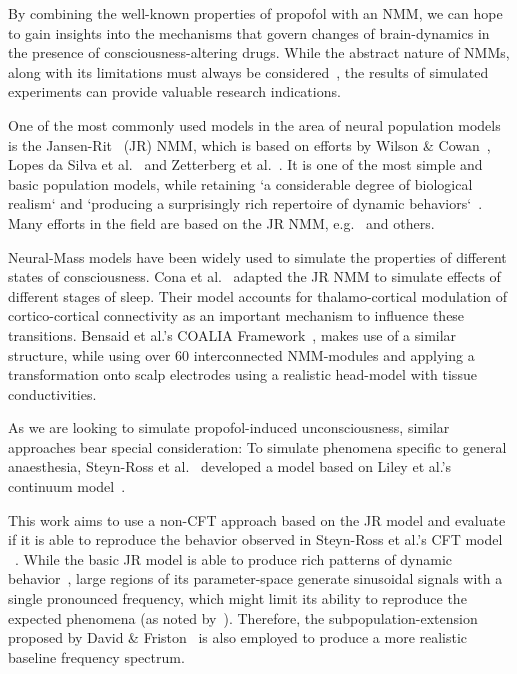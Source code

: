 
By combining the well-known properties of propofol with an NMM, we can hope to gain insights into the mechanisms that
govern changes of brain-dynamics in the presence of consciousness-altering drugs.
While the abstract nature of NMMs, along with its limitations must always be
considered~\cite{deschle_validity_2021},
the results of simulated experiments can provide valuable research indications.


One of the most commonly used models in the area of neural population models is the
Jansen-Rit~\cite{jansen_electroencephalogram_1995} (JR) NMM,
which is based on efforts by Wilson \& Cowan~\cite{wilson_excitatory_1972},
Lopes da Silva et al.~\cite{lopes_da_silva_model_1974, lopes_da_silva_models_1976} and
Zetterberg et al.~\cite{zetterberg_performance_1978}.
It is one of the most simple and basic population models,
while retaining `a considerable degree of biological realism` and
`producing a surprisingly rich repertoire of dynamic behaviors`~\cite{knösche_jansen-rit_2014}.
Many efforts in the field are based on the JR NMM, e.g.~\cite{wendling_relevance_2000, david_neural_2003,
    moran_dynamic_2009, spiegler_bifurcation_2010, cona_thalamo-cortical_2014, bensaid_coalia_2019} and others.



Neural-Mass models have been widely used to simulate the properties of different states of consciousness.
Cona et al.~\cite{cona_thalamo-cortical_2014} adapted the JR NMM to simulate effects
of different stages of sleep.
Their model accounts for thalamo-cortical modulation of cortico-cortical connectivity as an important mechanism to
influence these transitions.
Bensaid et al.'s COALIA Framework~\cite{bensaid_coalia_2019},
makes use of a similar structure, while using over 60 interconnected NMM-modules and applying a
transformation onto scalp electrodes using a realistic head-model with tissue conductivities.

As we are looking to simulate propofol-induced unconsciousness, similar approaches bear special consideration:
To simulate phenomena specific to general anaesthesia,
Steyn-Ross et al.~\cite{steyn_ross_modelling_2004, hutt_progress_2011} developed a model based
on Liley et al.'s continuum model~\cite{liley_continuum_1999}.

This work aims to use a non-CFT approach based on the JR model and evaluate if it is able to reproduce the
behavior observed in Steyn-Ross et al.'s CFT model ~\cite{hutt_progress_2011}.
While the basic JR model is able to produce rich patterns of dynamic behavior~\cite{spiegler_bifurcation_2010},
large regions of its parameter-space generate sinusoidal signals with a single pronounced frequency,
which might limit its ability to reproduce the expected phenomena (as noted by~\cite{kuhlmann_neural_2016}).
Therefore, the subpopulation-extension proposed by David \& Friston~\cite{david_neural_2003} is also employed to
produce a more realistic baseline frequency spectrum.

